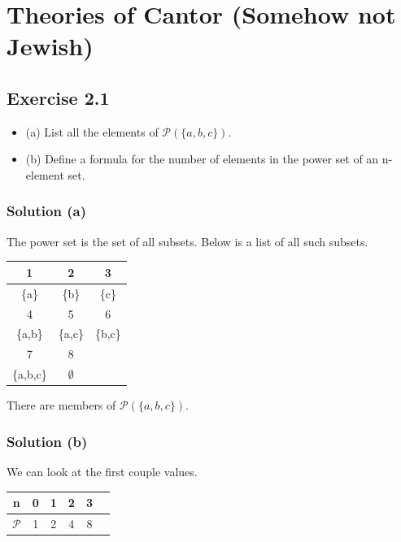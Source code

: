 \documentclass[12pt]{report}
\begin{document}
\renewcommand\qedsymbol{OE$\Delta$}
\newcommand{\abs}[1]{\left| #1 \right|}
\newcommand{\andtxt}{\text{ and }}
\newcommand{\mathif}{\text{if }}
\newcommand{\seq}[2][n]{\ensuremath{(#2 _{#1})}}

\tableofcontents
\pagebreak

\setcounter{chapter}{1}
\chapter{Theories of Cantor (Somehow not Jewish)}
\section{Exercise 2.1}
\begin{itemize}{}
    \item (a) List all the elements of $\mathcal{P}(\{a,b,c\})$. 
    \item (b) Define a formula for the number of elements in the power set of an n-element set.
\end{itemize}

\subsection{Solution (a)}
The power set is the set of all subsets.
Below is a list of all such subsets.
\begin{center}
    \begin{tabular}{|c|c|c|}
        \hline
        1 & 2 & 3 \\
        \hline
        \{a\} & \{b\} & \{c\} \\
        \hline \hline
        4 & 5 & 6 \\
        \hline
        \{a,b\} & \{a,c\} & \{b,c\} \\
        \hline \hline
        7 & 8 & \\
        \hline
        \{a,b,c\} & $\emptyset$ & \\
        \hline
    \end{tabular}
\end{center}

There are  members of $\mathcal{P}(\{a,b,c\})$. 

\subsection{Solution (b)}
We can look at the first couple values.
\begin{center}
    \begin{tabular}{|c|c|c|c|c|c}
        \hline
        n & 0 & 1 & 2 & 3 \\
        \hline
        $\mathcal{P}$ & 1 & 2 & 4 & 8 \\
        \hline
    \end{tabular}
\end{center}
\end{document}
